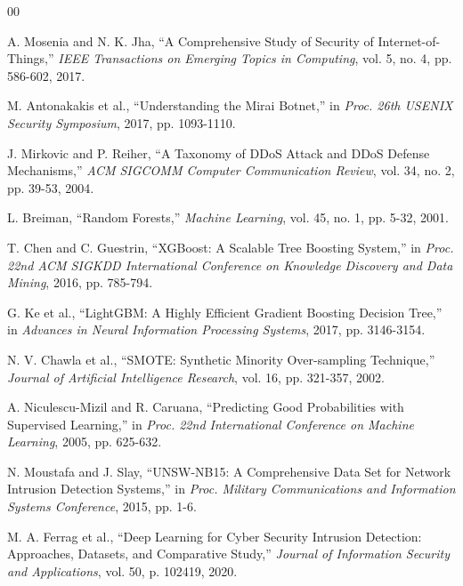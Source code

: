 \documentclass[conference]{IEEEtran}
\begin{document}
\begin{thebibliography}{00}

A. Mosenia and N. K. Jha, ``A Comprehensive Study of Security of Internet-of-Things,'' \textit{IEEE Transactions on Emerging Topics in Computing}, vol. 5, no. 4, pp. 586-602, 2017.

M. Antonakakis et al., ``Understanding the Mirai Botnet,'' in \textit{Proc. 26th USENIX Security Symposium}, 2017, pp. 1093-1110.

J. Mirkovic and P. Reiher, ``A Taxonomy of DDoS Attack and DDoS Defense Mechanisms,'' \textit{ACM SIGCOMM Computer Communication Review}, vol. 34, no. 2, pp. 39-53, 2004.

L. Breiman, ``Random Forests,'' \textit{Machine Learning}, vol. 45, no. 1, pp. 5-32, 2001.

T. Chen and C. Guestrin, ``XGBoost: A Scalable Tree Boosting System,'' in \textit{Proc. 22nd ACM SIGKDD International Conference on Knowledge Discovery and Data Mining}, 2016, pp. 785-794.

G. Ke et al., ``LightGBM: A Highly Efficient Gradient Boosting Decision Tree,'' in \textit{Advances in Neural Information Processing Systems}, 2017, pp. 3146-3154.

N. V. Chawla et al., ``SMOTE: Synthetic Minority Over-sampling Technique,'' \textit{Journal of Artificial Intelligence Research}, vol. 16, pp. 321-357, 2002.

A. Niculescu-Mizil and R. Caruana, ``Predicting Good Probabilities with Supervised Learning,'' in \textit{Proc. 22nd International Conference on Machine Learning}, 2005, pp. 625-632.

N. Moustafa and J. Slay, ``UNSW-NB15: A Comprehensive Data Set for Network Intrusion Detection Systems,'' in \textit{Proc. Military Communications and Information Systems Conference}, 2015, pp. 1-6.

M. A. Ferrag et al., ``Deep Learning for Cyber Security Intrusion Detection: Approaches, Datasets, and Comparative Study,'' \textit{Journal of Information Security and Applications}, vol. 50, p. 102419, 2020.

\end{thebibliography}
\end{document}
